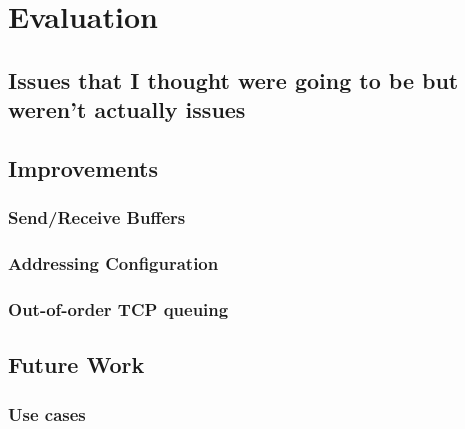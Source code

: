 
\section{Evaluation} %
    \subsection{Issues that I thought were going to be but weren't actually issues}
    \subsection{Improvements}
        \subsubsection{Send/Receive Buffers}
            
        \subsubsection{Addressing Configuration}
        \subsubsection{Out-of-order TCP queuing}
    \subsection{Future Work}
        \subsubsection{Use cases}

